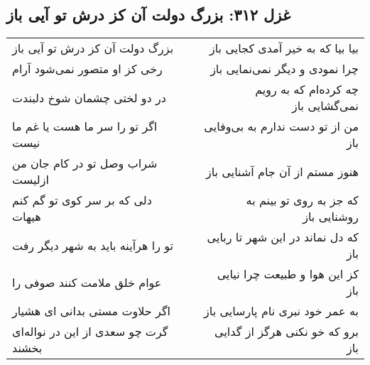 \begin{center}
\section*{غزل ۳۱۲: بزرگ دولت آن کز درش تو آیی باز}
\label{sec:312}
\begin{longtable}{l p{0.5cm} r}
بزرگ دولت آن کز درش تو آیی باز
&&
بیا بیا که به خیر آمدی کجایی باز
\\
رخی کز او متصور نمی‌شود آرام
&&
چرا نمودی و دیگر نمی‌نمایی باز
\\
در دو لختی چشمان شوخ دلبندت
&&
چه کرده‌ام که به رویم نمی‌گشایی باز
\\
اگر تو را سر ما هست یا غم ما نیست
&&
من از تو دست ندارم به بی‌وفایی باز
\\
شراب وصل تو در کام جان من ازلیست
&&
هنوز مستم از آن جام آشنایی باز
\\
دلی که بر سر کوی تو گم کنم هیهات
&&
که جز به روی تو بینم به روشنایی باز
\\
تو را هرآینه باید به شهر دیگر رفت
&&
که دل نماند در این شهر تا ربایی باز
\\
عوام خلق ملامت کنند صوفی را
&&
کز این هوا و طبیعت چرا نیایی باز
\\
اگر حلاوت مستی بدانی ای هشیار
&&
به عمر خود نبری نام پارسایی باز
\\
گرت چو سعدی از این در نواله‌ای بخشند
&&
برو که خو نکنی هرگز از گدایی باز
\\
\end{longtable}
\end{center}
